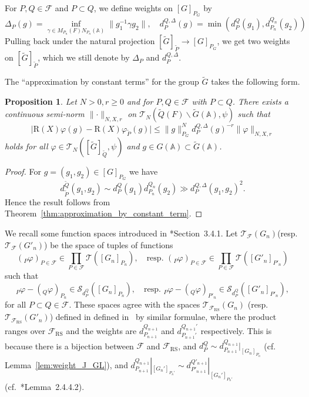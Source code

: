 \documentclass[letterpaper,11pt]{amsart}
\newcommand{\bA}{\mathbb{A}}
\newcommand{\cF}{\mathcal{F}}
\newcommand{\cS}{\mathcal{S}}
\newcommand{\cT}{\mathcal{T}}
\newcommand{\bs}{\backslash}
\newcommand{\<}{\negthickspace}
\providecommand{\abs}[1]{\lvert#1\rvert}
\providecommand{\aabs}[1]{\lVert#1\rVert}
\theoremstyle{definition}
\theoremstyle{plain}
\newtheorem{prop}[definition]{Proposition}
\theoremstyle{remark}
\numberwithin{equation}{section}
\begin{document}
For $P,Q \in \cF$ and $P \subset Q$, we define weights on
$[G]_{P_G}$ by
    \[
    \Delta_P(g)=
    \inf_{\gamma \in M_{P_n}(F)N_{P_n}(\bA)} \| g_1^{-1} \gamma g_2 \|, \quad
    d_P^{Q,\Delta}(g) =
    \min \left( d_{P}^{Q}(g_1),d_{P_{n}}^{Q_{n}}(g_2) \right)
    \]
Pulling back under the natural projection $[\widetilde{G}]_{\widetilde{P}}
\to [G]_{P_G}$, we get two weights on
$[\widetilde{G}]_{\widetilde{P}}$, which we still denote by $\Delta_P$ and
$d_P^{Q,\Delta}$.


The ``approximation by constant terms'' for the group $\widetilde{G}$
takes the following form.

\begin{prop} \label{prop:approximating_constant_term_product}
Let $N>0,r \ge 0$ and for $P, Q\in \cF$ with $P \subset Q$. There exists a
continuous semi-norm $\aabs{\cdot}_{N,X,r}$ on $\cT_N(\widetilde{Q}(F) \bs
\widetilde{G}(\bA), \psi)$ such that
    \[
    \abs{\mathrm{R}(X)\varphi(g)-\mathrm{R}(X) \varphi_{\widetilde{P}}(g)}
    \le \aabs{g}_{P_G}^N d_{P}^{Q, \Delta}(g)^{-r}
    \aabs{\varphi}_{N,X,r}
    \]
holds for all $\varphi \in \cT_N([\widetilde{G}]_{\widetilde{Q}},\psi)$
and $g \in G(\bA) \subset \widetilde{G}(\bA)$.
\end{prop}

\begin{proof}
For $g= (g_1, g_2) \in [G]_{P_G}$ we have
    \[
    d_{\widetilde{P}}^{\widetilde{Q}}(g_1,g_2)
    \sim  d_P^Q(g_1) d_{P_n}^{Q_n}(g_2)
    \gg d_P^{Q,\Delta}(g_1,g_2)^2.
    \]
Hence the result follows from
Theorem~\ref{thm:approximation_by_constant_term}.
\end{proof}


We recall some function spaces introduced in \cite{BPCZ}*{Section~3.4.1}.
Let $\cT_{\cF}(G_n)$(resp. $\cT_{\cF}(G'_n)$) be the space of tuples of functions
    \[
    ( {}_P \varphi )_{P \in \cF}
    \in \prod_{P \in \cF} \cT([G_n]_{P_n}), \quad
    \text{resp. } ( {}_P \varphi )_{P \in \cF}
    \in \prod_{P \in \cF} \cT([G'_n]_{P'_n})
    \]
such that
    \[
    {}_P\varphi - ({}_Q \varphi)_{P_n}
    \in \cS_{d_{P}^{Q}}([G_n]_{P_n}),\quad
    \text{resp. } {}_P\varphi - ({}_Q \varphi)_{P'_n}
    \in \cS_{d_P^Q}([G'_n]_{P'_n}),
    \]
for all $P \subset Q \in \cF$.
These spaces agree with the spaces  $\cT_{\cF_\mathrm{RS}}(G_n)$
(resp. $\cT_{\cF_\mathrm{RS}}(G'_n)$) defined in defined in~\cite{BPCZ}
by similar formulae,
where the product ranges over  $\cF_{\mathrm{RS}}$
and the weights are $d_{P_{n+1}}^{Q_{n+1}}$ and $d_{P_{n+1}'}^{Q_{n+1}'}$
respectively.
This is because there is a bijection between $\cF$ and $\cF_{\mathrm{RS}}$, and $d_P^Q
\sim d_{P_{n+1}}^{Q_{n+1}}|_{[G_n]_{P_n}}$ (cf. Lemma~\ref{lem:weight_J_GL}), and
$d_{P_{n+1}}^{Q_{n+1}}|_{[G_n']_{P_n'}} \sim d_{P'_{n+1}}^{Q'_{n+1}}|_{[G_n']_{P_n'}}$
(cf.~\cite{BPCZ}*{Lemma~2.4.4.2}).
\end{document}
